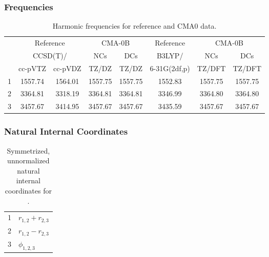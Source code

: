 \documentclass[10pt,oneside]{article}
\begin{document}
\clearpage

\subsubsection*{Frequencies}
\begin{table}[h!]
\centering
\caption{Harmonic frequencies for reference and CMA0 data.}
\begin{tabular}{cccccccc}
\toprule
{} & \multicolumn{2}{c}{Reference} & \multicolumn{2}{c}{CMA-0B} &    Reference & \multicolumn{2}{c}{CMA-0B} \\
{} & \multicolumn{2}{c}{CCSD(T)/} &     NCs &     DCs &       B3LYP/ &     NCs &     DCs \\
{} &   cc-pVTZ & cc-pVDZ &   TZ/DZ &   TZ/DZ & 6-31G(2df,p) &  TZ/DFT &  TZ/DFT \\
\midrule
1 &   1557.74 & 1564.01 & 1557.75 & 1557.75 &      1552.83 & 1557.75 & 1557.75 \\
2 &   3364.81 & 3318.19 & 3364.81 & 3364.81 &      3346.99 & 3364.80 & 3364.80 \\
3 &   3457.67 & 3414.95 & 3457.67 & 3457.67 &      3435.59 & 3457.67 & 3457.67 \\
\bottomrule
\end{tabular}
\end{table}

\clearpage

\subsubsection*{Natural Internal Coordinates}
\begin{table}[h!]
\centering
\caption{Symmetrized, unnormalized natural internal coordinates for .}
\small
\begin{tabular}{ll}
  1   & $r_{1,2} + r_{2,3}$ \\
  2   & $r_{1,2} - r_{2,3}$ \\
  3   & $\phi_{1,2,3}$ \\
\end{tabular}
\end{table}

\clearpage

\subsection{\ \ \ }
\end{document}
